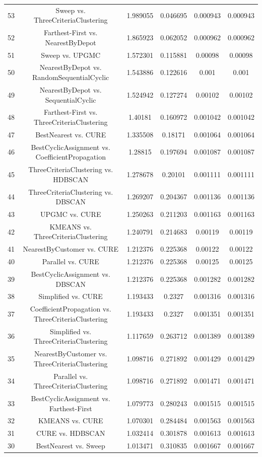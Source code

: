\documentclass[a4paper,10pt]{article}
\begin{document}
\begin{landscape}
\begin{table}[!htp]
\begin{tabular}{cccccc}
53&Sweep vs. ThreeCriteriaClustering&1.989055&0.046695&0.000943&0.000943\\
52&Farthest-First vs. NearestByDepot&1.865923&0.062052&0.000962&0.000962\\
51&Sweep vs. UPGMC&1.572301&0.115881&0.00098&0.00098\\
50&NearestByDepot vs. RandomSequentialCyclic&1.543886&0.122616&0.001&0.001\\
49&NearestByDepot vs. SequentialCyclic&1.524942&0.127274&0.00102&0.00102\\
48&Farthest-First vs. ThreeCriteriaClustering&1.40181&0.160972&0.001042&0.001042\\
47&BestNearest vs. CURE&1.335508&0.18171&0.001064&0.001064\\
46&BestCyclicAssignment vs. CoefficientPropagation&1.28815&0.197694&0.001087&0.001087\\
45&ThreeCriteriaClustering vs. HDBSCAN&1.278678&0.20101&0.001111&0.001111\\
44&ThreeCriteriaClustering vs. DBSCAN&1.269207&0.204367&0.001136&0.001136\\
43&UPGMC vs. CURE&1.250263&0.211203&0.001163&0.001163\\
42&KMEANS vs. ThreeCriteriaClustering&1.240791&0.214683&0.00119&0.00119\\
41&NearestByCustomer vs. CURE&1.212376&0.225368&0.00122&0.00122\\
40&Parallel vs. CURE&1.212376&0.225368&0.00125&0.00125\\
39&BestCyclicAssignment vs. DBSCAN&1.212376&0.225368&0.001282&0.001282\\
38&Simplified vs. CURE&1.193433&0.2327&0.001316&0.001316\\
37&CoefficientPropagation vs. ThreeCriteriaClustering&1.193433&0.2327&0.001351&0.001351\\
36&Simplified vs. ThreeCriteriaClustering&1.117659&0.263712&0.001389&0.001389\\
35&NearestByCustomer vs. ThreeCriteriaClustering&1.098716&0.271892&0.001429&0.001429\\
34&Parallel vs. ThreeCriteriaClustering&1.098716&0.271892&0.001471&0.001471\\
33&BestCyclicAssignment vs. Farthest-First&1.079773&0.280243&0.001515&0.001515\\
32&KMEANS vs. CURE&1.070301&0.284484&0.001563&0.001563\\
31&CURE vs. HDBSCAN&1.032414&0.301878&0.001613&0.001613\\
30&BestNearest vs. Sweep&1.013471&0.310835&0.001667&0.001667\\

\end{tabular}
\end{table}
\end{landscape}
\end{document}
